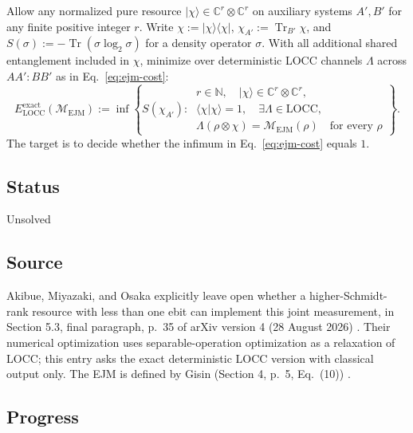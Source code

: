 Allow any normalized pure resource $|\chi\rangle\in\mathbb C^r\otimes\mathbb C^r$ on auxiliary systems $A',B'$ for any finite positive integer $r$. Write $\chi:=|\chi\rangle\langle\chi|$, $\chi_{A'}:=\operatorname{Tr}_{B'}\chi$, and $S(\sigma):=-\operatorname{Tr}(\sigma\log_2\sigma)$ for a density operator $\sigma$. With all additional shared entanglement included in $\chi$, minimize over deterministic LOCC channels $\Lambda$ across $AA':BB'$ as in Eq.~\eqref{eq:ejm-cost}:
\begin{equation}
E_{\mathrm{LOCC}}^{\mathrm{exact}}(\mathcal M_{\mathrm{EJM}}):=\inf\left\{
S(\chi_{A'}):\ \begin{gathered}
r\in\mathbb N,\quad |\chi\rangle\in\mathbb C^r\otimes\mathbb C^r,\\
\langle\chi|\chi\rangle=1,\quad \exists\Lambda\in\mathrm{LOCC},\\
\Lambda(\rho\otimes\chi)=\mathcal M_{\mathrm{EJM}}(\rho)\quad\text{for every }\rho
\end{gathered}\right\}.
\label{eq:ejm-cost}
\end{equation}
The target is to decide whether the infimum in Eq.~\eqref{eq:ejm-cost} equals $1$.

\subsection*{Status}

Unsolved

\subsection*{Source}

Akibue, Miyazaki, and Osaka explicitly leave open whether a higher-Schmidt-rank resource with less than one ebit can implement this joint measurement, in Section 5.3, final paragraph, p.~35 of arXiv version 4 (28 August 2026) . Their numerical optimization uses separable-operation optimization as a relaxation of LOCC; this entry asks the exact deterministic LOCC version with classical output only. The EJM is defined by Gisin (Section 4, p.~5, Eq.~(10)) .

\subsection*{Progress}

